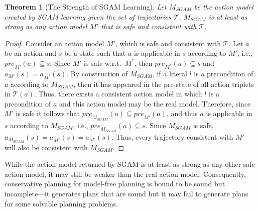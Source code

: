 \documentclass{article}
\newtheorem{theorem}{Theorem}
\newcommand{\pre}{\textit{pre}}
\newcommand{\realm}{\ensuremath{M^*}\xspace}
\newcommand{\sgam}{\textit{SGAM}\xspace}
\begin{document}
\begin{theorem}[The Strength of SGAM Learning]
Let $M_{SGAM}$ be the action model created by SGAM learning given the set of trajectories $\mathcal{T}$. 
$M_{SGAM}$ is at least as strong as any action model $M'$ that is safe and consistent with $\mathcal{T}$. %
\label{thm:sam-learning-complete-grounded}
\end{theorem}
\begin{proof}
Consider an action model $M'$, which is safe and consistent with $\mathcal{T}$. %
Let $a$ be an action and $s$ be a state such that $a$ is applicable in $s$ according to $M'$, i.e., $\pre_{M'}(a)\subseteq s$. 
Since $M'$ is safe w.r.t.\ \realm, then 
$\pre_{\realm}(a)\subseteq s$
and $a_{M'}(s)=a_{\realm}(s)$. 
By construction of $M_\sgam$, if a literal $l$ is a precondition of $a$ according to $M_\sgam$, 
then it has appeared in the pre-state of all action triplets in $\mathcal{T}(a)$. 
Thus, there exists a consistent action model in which $l$ is a precondition of $a$ 
and this action model may be the real model. 
Therefore, since $M'$ is safe it follows that $\pre_{M_\sgam}(a) \subseteq \pre_{M'}(a)$, 
and thus $a$ is applicable in $s$ according to $M_\sgam$, 
i.e., $\pre_{M_\sgam}(a)\subseteq s$. 
Since $M_\sgam$ is safe, %
$a_{M_\sgam}(s)=a_{\realm}(s)=a_{M'}(s)$. %
Thus, every trajectory consistent with  $M'$ will also be consistent with $M_\sgam$.
\end{proof}

While the action model returned by SGAM is at least as strong as any other safe action model, it may still be weaker than the real action model. Consequently, conservative planning for model-free planning is bound to be sound but incomplete---it generates plans that are sound but it may fail to generate plans for some solvable planning problems. 
\end{document}
